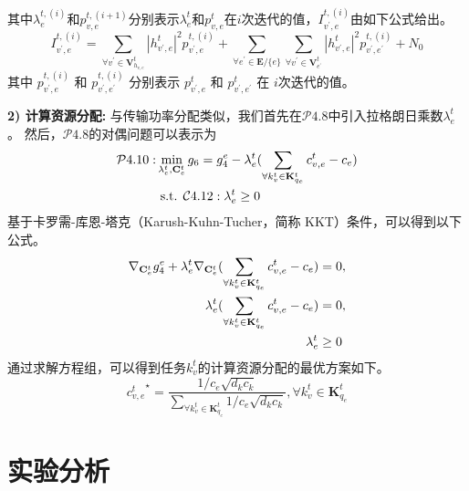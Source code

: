其中$\lambda_{e}^{t,(i)}$和$p_{v, e}^{t, (i+1)}$分别表示$\lambda_{e}^{t}$和$p_{v, e}^{t}$在$i$次迭代的值，${I}_{v^{\prime}, e}^{t, (i)}$由如下公式给出。
\begin{equation}
	{I}_{v^{\prime}, e}^{t, (i)} = \sum\limits_{\forall v^{\prime} \in \mathbf{V}_{h_{v, e}}^{t}} |h_{v^{\prime}, e}^t|^2 p_{v^{\prime}, e}^{t, (i)} + \sum\limits_{\forall e^{\prime} \in \mathbf{E} / \{e\}} \sum\limits_{\forall v^{\prime} \in \mathbf{V}_{e^{\prime}}^{t}} |h_{v^{\prime}, e}^t|^2 p_{v^{\prime}, e^{\prime}}^{t, (i)} + N_{0}
\end{equation}
其中 $p_{v^{\prime}, e}^{t, (i)}$ 和 $p_{v^{\prime}, e^{\prime}}^{t, (i)}$ 分别表示 $p_{v^{\prime}, e}^{t}$ 和 $p_{v^{\prime}, e^{\prime}}^{t}$ 在 $i$次迭代的值。

\textbf{2) 计算资源分配:} 与传输功率分配类似，我们首先在$\mathcal{P}4.8$中引入拉格朗日乘数${\lambda}_{e}^{t}$。
然后，$\mathcal{P}4.8$的对偶问题可以表示为
\begin{align}
	\mathcal{P}4.10: & \min_{\mathbf{\lambda}_{e}^{t}, \mathbf{{C}}_{e}^{t}}  g_6 = g_4^e - {\lambda}_{e}^{t} (\sum_{\forall k_{v}^{t} \in {\mathbf{K}_{q_e}^{t} }} {c_{v, e}^t} - c_{e} ) \notag \\
		&\text { s.t. } \mathcal{C}4.12: \mathbf{\lambda}_{e}^{t} \geq 0 
\end{align}
基于卡罗需-库恩-塔克（Karush-Kuhn-Tucher，简称 KKT）条件\cite{boyd2004convex}，可以得到以下公式。
\begin{align}
	\nabla_{\mathbf{C}_e^{t}} g_4^e + \mathbf{\lambda}_{e}^{t}\nabla_{\mathbf{C}_e^{t}} (\sum_{\forall k_{v}^{t} \in {\mathbf{K}_{q_e}^{t} }} {c_{v, e}^t} - c_{e} ) &= 0, \notag \\
	\mathbf{\lambda}_{e}^{t}( \sum_{\forall k_{v}^{t} \in {\mathbf{K}_{q_e}^{t} }} {c_{v, e}^t} - {c_{e}} ) &= 0, \notag \\
	\mathbf{\lambda}_{e}^{t} &\geq 0
\end{align}
通过求解方程组，可以得到任务$k_{v}^{t}$的计算资源分配的最优方案如下。
\begin{equation}
	{c_{v, e}^{t}}^{\star} = \frac{1 / c_e \sqrt{d_k  c_k} } {\sum_{\forall k_{v}^{t} \in {\mathbf{K}_{q_e}^{t} }} 1 / c_e \sqrt{d_k  c_k}} , \forall k_{v}^{t} \in {\mathbf{K}_{q_e}^{t} } 
\end{equation}

\section{实验分析}\label{section 4-5}

